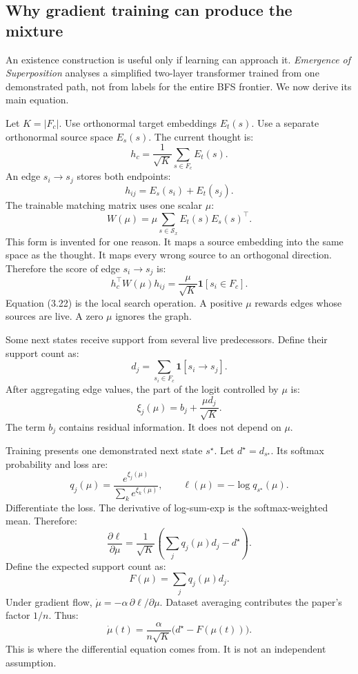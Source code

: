 \documentclass[11pt]{article}
\theoremstyle{definition}
\begin{document}
\subsection{Why gradient training can produce the mixture}

An existence construction is useful only if learning can approach it. \emph{Emergence of Superposition} analyses a simplified two-layer transformer trained from one demonstrated path, not from labels for the entire BFS frontier. We now derive its main equation.

Let $K=|F_c|$. Use orthonormal target embeddings $E_t(s)$. Use a separate orthonormal source space $E_s(s)$. The current thought is:
\[
h_c=\frac{1}{\sqrt K}\sum_{s\in F_c}E_t(s).
\tag{3.19}
\]
An edge $s_i\to s_j$ stores both endpoints:
\[
h_{ij}=E_s(s_i)+E_t(s_j).
\tag{3.20}
\]
The trainable matching matrix uses one scalar $\mu$:
\[
W(\mu)=\mu\sum_{s\in\mathcal S_x}E_t(s)E_s(s)^\top.
\tag{3.21}
\]
This form is invented for one reason. It maps a source embedding into the same space as the thought. It maps every wrong source to an orthogonal direction. Therefore the score of edge $s_i\to s_j$ is:
\[
h_c^\top W(\mu)h_{ij}
=\frac{\mu}{\sqrt K}\mathbf 1[s_i\in F_c].
\tag{3.22}
\]
Equation (3.22) is the local search operation. A positive $\mu$ rewards edges whose sources are live. A zero $\mu$ ignores the graph.

Some next states receive support from several live predecessors. Define their support count as:
\[
d_j=\sum_{s_i\in F_c}\mathbf 1[s_i\to s_j].
\tag{3.23}
\]
After aggregating edge values, the part of the logit controlled by $\mu$ is:
\[
\xi_j(\mu)=b_j+\frac{\mu d_j}{\sqrt K}.
\tag{3.24}
\]
The term $b_j$ contains residual information. It does not depend on $\mu$.

Training presents one demonstrated next state $s^\star$. Let $d^\star=d_{s^\star}$. Its softmax probability and loss are:
\[
q_j(\mu)=\frac{e^{\xi_j(\mu)}}{\sum_k e^{\xi_k(\mu)}},
\qquad
\ell(\mu)=-\log q_{s^\star}(\mu).
\tag{3.25}
\]
Differentiate the loss. The derivative of log-sum-exp is the softmax-weighted mean. Therefore:
\[
\frac{\partial\ell}{\partial\mu}
=\frac{1}{\sqrt K}
\left(\sum_j q_j(\mu)d_j-d^\star\right).
\tag{3.26}
\]
Define the expected support count as:
\[
F(\mu)=\sum_j q_j(\mu)d_j.
\tag{3.27}
\]
Under gradient flow, $\dot\mu=-\alpha\,\partial\ell/\partial\mu$. Dataset averaging contributes the paper's factor $1/n$. Thus:
\[
\dot\mu(t)=\frac{\alpha}{n\sqrt K}
\bigl(d^\star-F(\mu(t))\bigr).
\tag{3.28}
\]
This is where the differential equation comes from. It is not an independent assumption.
\end{document}
